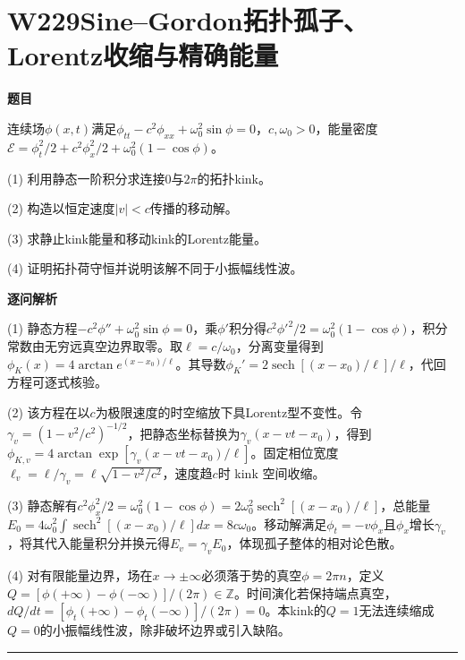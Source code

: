 \documentclass[UTF8,a4paper,11pt,oneside,openany]{ctexbook}
\begin{document}
\section*{W229\quad Sine–Gordon拓扑孤子、Lorentz收缩与精确能量}
\textbf{题目}\par
连续场$\phi(x,t)$满足$\phi_{tt}-c^2\phi_{xx}+\omega_0^2\sin\phi=0$，$c,\omega_0>0$，能量密度$\mathcal E=\phi_t^2/2+c^2\phi_x^2/2+\omega_0^2(1-\cos\phi)$。
\par\smallskip\noindent (1) 利用静态一阶积分求连接0与$2\pi$的拓扑kink。
\par\smallskip\noindent (2) 构造以恒定速度$|v|<c$传播的移动解。
\par\smallskip\noindent (3) 求静止kink能量和移动kink的Lorentz能量。
\par\smallskip\noindent (4) 证明拓扑荷守恒并说明该解不同于小振幅线性波。
\par\medskip\textbf{逐问解析}\par
\par\smallskip\noindent (1) 静态方程$-c^2\phi''+\omega_0^2\sin\phi=0$，乘$\phi'$积分得$c^2\phi'^2/2=\omega_0^2(1-\cos\phi)$，积分常数由无穷远真空边界取零。取$\ell=c/\omega_0$，分离变量得到$\phi_K(x)=4\arctan e^{(x-x_0)/\ell}$。其导数$\phi_K'=2\operatorname{sech}[(x-x_0)/\ell]/\ell$，代回方程可逐式核验。
\par\smallskip\noindent (2) 该方程在以$c$为极限速度的时空缩放下具Lorentz型不变性。令$\gamma_v=(1-v^2/c^2)^{-1/2}$，把静态坐标替换为$\gamma_v(x-vt-x_0)$，得到$\phi_{K,v}=4\arctan\exp[\gamma_v(x-vt-x_0)/\ell]$。固定相位宽度$\ell_v=\ell/\gamma_v=\ell\sqrt{1-v^2/c^2}$，速度趋$c$时 kink 空间收缩。
\par\smallskip\noindent (3) 静态解有$c^2\phi_x^2/2=\omega_0^2(1-\cos\phi)=2\omega_0^2\operatorname{sech}^2[(x-x_0)/\ell]$，总能量$E_0=4\omega_0^2\int\operatorname{sech}^2[(x-x_0)/\ell]dx=8c\omega_0$。移动解满足$\phi_t=-v\phi_x$且$\phi_x$增长$\gamma_v$，将其代入能量积分并换元得$E_v=\gamma_v E_0$，体现孤子整体的相对论色散。
\par\smallskip\noindent (4) 对有限能量边界，场在$x\to\pm\infty$必须落于势的真空$\phi=2\pi n$，定义$Q=[\phi(+\infty)-\phi(-\infty)]/(2\pi)\in\mathbb Z$。时间演化若保持端点真空，$dQ/dt=[\phi_t(+\infty)-\phi_t(-\infty)]/(2\pi)=0$。本kink的$Q=1$无法连续缩成$Q=0$的小振幅线性波，除非破坏边界或引入缺陷。
\par\medskip\hrule\medskip
\end{document}
